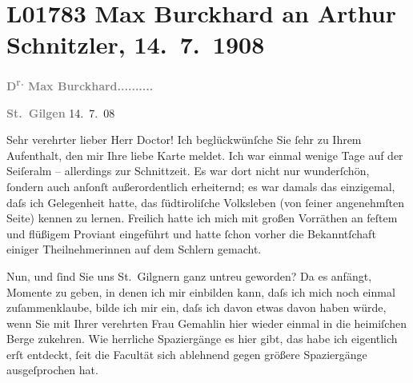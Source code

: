 

\section[Max Burckhard an Arthur Schnitzler, 14. 7. 1908]{L01783 Max Burckhard an Arthur Schnitzler, 14. 7. 1908}
\nopagebreak{}
\rehead{ }\normalsize\beginnumbering{}
\toendnotes[C]{\smallbreak\pagebreak[2]}
\toendnotes[C]{\smallbreak}
\pstart
           {\pb}\textcolor{gray}{\textbf{D\textsuperscript{r.} Max Burckhard}}\hfill \textcolor{gray}{\textbf{..........}}\pend
           
\pstart
           \raggedleft{}\textcolor{gray}{\textbf{St. Gilgen}}{ }14. 7. 08\pend
           
\pstart{}Sehr verehrter lieber Herr Doctor!\pend\vspace{0.5em}
\pstart
           Ich beglückwünſche Sie ſehr  zu Ihrem Aufenthalt,
               den mir Ihre liebe Karte meldet. Ich war einmal wenige Tage auf der Seiſeralm – allerdings zur Schnittzeit. Es war
               dort nicht nur wunderſchön, ſondern auch anſonſt außerordentlich erheiternd; es war
               damals das einzigemal, daſs ich Gelegenheit hatte, das ſüdtiroliſche Volksleben (von ſeiner angenehmſten Seite) kennen zu lernen.
               Freilich hatte ich mich mit großen Vorräthen an feſtem und flüßigem Proviant
               eingeführt und hatte ſchon vorher die Bekanntſchaft einiger Theilnehmerinnen auf dem{ }Schlern gemacht.\pend
           
\pstart
           {\pb}Nun, und ſind Sie uns St. Gilgnern ganz untreu geworden? Da es anfängt, Momente zu
               geben, in denen ich mir einbilden kann, daſs ich mich noch einmal zuſammenklaube,
               bilde ich mir ein, daſs ich davon etwas davon haben würde, wenn Sie mit Ihrer
               verehrten Frau Gemahlin hier
               wieder einmal in die heimiſchen Berge zukehren. Wie herrliche Spaziergänge es hier
               gibt, das habe ich eigentlich erſt entdeckt, ſeit die Facultät sich ablehnend gegen
               größere Spaziergänge ausgeſprochen hat.\pend
           
